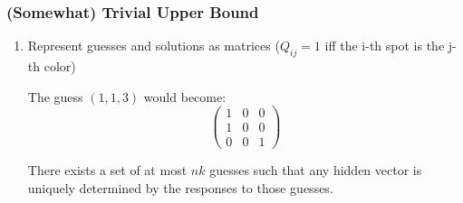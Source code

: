 \documentclass{beamer}
\begin{document}
    \begin{frame}
    \frametitle{(Somewhat) Trivial Upper Bound}
	 \begin{enumerate}[label=\arabic*.]
	\item Represent guesses and solutions as matrices ($Q_{ij} = 1$ iff the i-th spot is the j-th color) \\
	\begin{tcolorbox}[colback=blue!5,colframe=blue!40!black,title=Example]
	The guess $(1,1,3)$ would become:
	\[ \left( \begin{array}{ccc}
	1 & 0 & 0 \\
	1 & 0 & 0 \\
	0 & 0 & 1 \end{array} \right)\]
	\end{tcolorbox}
	\begin{tcolorbox}[colback=blue!5,colframe=blue!40!black,title=Theorem]
	There exists a set of at most $nk$ guesses such that any hidden vector is uniquely determined by the responses
	to those guesses.
	\end{tcolorbox} 
	\end{enumerate}
    \end{frame}


\end{document}
